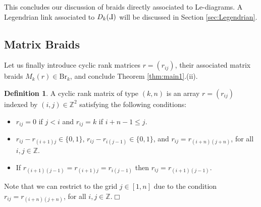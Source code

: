 \documentclass[10pt]{amsart}
\theoremstyle{plain}
\newtheorem{cor}[thm]{Corollary}
\theoremstyle{definition}
\newtheorem{definition}[thm]{Definition}
\theoremstyle{remark}
\numberwithin{equation}{section}
\newcommand{\Z}{\mathbb{Z}}
\newcommand{\R}{\mathbb{R}}
\newcommand{\std}{\text{st}}
\newcommand{\Br}{\mathrm{Br}}
\newcommand{\JS}[1]{{\color{cyan}{{\bf Jos\'e}: #1}}}
\newcommand{\MG}[1]{{\color{teal}{{\bf Misha}: #1}}}
\def\Le{\reflectbox{$\mathrm{L}$}}
\begin{document}
\noindent This concludes our discussion of braids directly associated to Le-diagrams. A Legendrian link associated to $D_k(\Le)$ will be discussed in Section \ref{sec:Legendrian}.

    


\subsection{Matrix Braids}\label{ssec:MatrixBraids} 
Let us finally introduce cyclic rank matrices $r=(r_{ij})$, their associated matrix braids $M_k(r)\in\Br_k$, and conclude Theorem \ref{thm:main1}.(ii).




\begin{definition}\label{def:rankmatrix}
A cyclic rank matrix of type $(k,n)$ is an array $r=(r_{ij})$ indexed by $(i,j)\in\Z^2$ satisfying the following conditions:
\begin{itemize}
	\item[(i)] $r_{ij}= 0$ if $j<i$ and $r_{ij}=k$ if $i+n-1\leq j$.
	\item[(ii)] $r_{ij}-r_{(i+1)j}\in\{0,1\}$, $r_{ij}-r_{i(j-1)}\in\{0,1\}$, and $r_{ij}=r_{(i+n)(j+n)}$, for all $i,j\in\Z$.
	\item[(iii)] If $r_{(i+1)(j-1)}=r_{(i+1)j}=r_{i(j-1)}$ then $r_{ij}=r_{(i+1)(j-1)}$.
\end{itemize}
Note that we can restrict to the grid $j\in[1,n]$ 
due to the condition $r_{ij}=r_{(i+n)(j+n)}$, for all $i,j\in\Z$.\hfill$\Box$
\end{definition}
\end{document}

